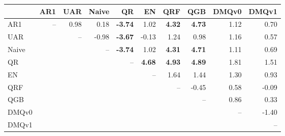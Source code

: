 \begin{tabular}{lrrrrrrrrr}
\toprule
 & AR1 & UAR & Naive & QR & EN & QRF & QGB & DMQv0 & DMQv1 \\
\midrule
AR1 & -- & 0.98 & 0.18 & \textbf{-3.74} & 1.02 & \textbf{4.32} & \textbf{4.73} & 1.12 & 0.70 \\
UAR &  & -- & -0.98 & \textbf{-3.67} & -0.13 & 1.24 & 0.98 & 1.16 & 0.57 \\
Naive &  &  & -- & \textbf{-3.74} & 1.02 & \textbf{4.31} & \textbf{4.71} & 1.11 & 0.69 \\
QR &  &  &  & -- & \textbf{4.68} & \textbf{4.93} & \textbf{4.89} & 1.81 & 1.51 \\
EN &  &  &  &  & -- & 1.64 & 1.44 & 1.30 & 0.93 \\
QRF &  &  &  &  &  & -- & -0.45 & 0.58 & -0.09 \\
QGB &  &  &  &  &  &  & -- & 0.86 & 0.33 \\
DMQv0 &  &  &  &  &  &  &  & -- & -1.40 \\
DMQv1 &  &  &  &  &  &  &  &  & -- \\
\bottomrule
\end{tabular}
